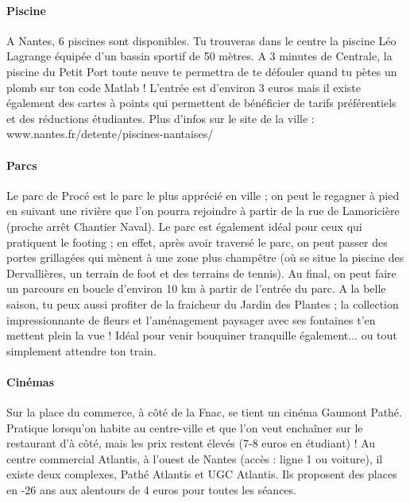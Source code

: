 \paragraph{Piscine}
A Nantes, 6 piscines sont disponibles. Tu trouveras dans le centre la piscine Léo Lagrange équipée d'un bassin sportif de 50 mètres. A 3 minutes de Centrale, la piscine du Petit Port toute neuve te permettra de te défouler quand tu pètes un plomb sur ton code Matlab ! L'entrée est d'environ 3 euros mais il existe également des cartes à points qui permettent de bénéficier de tarifs préférentiels et des réductions étudiantes. Plus d'infos sur le site de la ville : www.nantes.fr/detente/piscines-nantaises/
\paragraph{Parcs}
Le parc de Procé       est le parc le plus apprécié en ville ; on peut le regagner à pied en suivant une rivière que l'on pourra rejoindre à partir de la rue de Lamoricière (proche arrêt Chantier Naval). Le parc est également idéal pour ceux qui pratiquent le footing ; en effet, après avoir traversé le parc, on peut passer des portes grillagées qui mènent à une zone plus champêtre (où se situe la piscine des Dervallières, un terrain de foot et des terrains de tennis). Au final, on peut faire un parcours en boucle d'environ 10 km à partir de l'entrée du parc.
A la belle saison, tu peux aussi profiter de la fraicheur du Jardin des Plantes        ; la collection impressionnante de fleurs et l'aménagement paysager avec ses fontaines t'en mettent plein la vue ! Idéal pour venir bouquiner tranquille également... ou tout simplement attendre ton train.
\paragraph{Cinémas}
Sur la place du commerce, à côté de la Fnac, se tient un cinéma Gaumont Pathé. Pratique lorsqu'on habite au centre-ville et que l'on veut enchaîner sur le restaurant d'à côté, mais les prix restent élevés (7-8 euros en étudiant) !
Au centre commercial Atlantis, à l'ouest de Nantes (accès : ligne 1 ou voiture), il existe deux complexes, Pathé Atlantis et UGC Atlantis. Ils proposent des places en -26 ans aux alentours de 4 euros pour toutes les séances.

